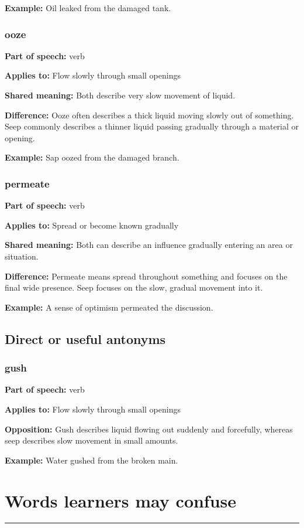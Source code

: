 \documentclass[11pt]{article}
\newcommand{\sectionrule}{\par\vspace{-0.5em}\noindent\textcolor{Accent}{\rule{\linewidth}{0.6pt}}\par}
\begin{document}
\textbf{Example:} Oil leaked from the damaged tank.

\subsubsection{ooze}
\textbf{Part of speech:} verb

\textbf{Applies to:} Flow slowly through small openings

\textbf{Shared meaning:} Both describe very slow movement of liquid.

\textbf{Difference:} Ooze often describes a thick liquid moving slowly out of something. Seep commonly describes a thinner liquid passing gradually through a material or opening.

\textbf{Example:} Sap oozed from the damaged branch.

\subsubsection{permeate}
\textbf{Part of speech:} verb

\textbf{Applies to:} Spread or become known gradually

\textbf{Shared meaning:} Both can describe an influence gradually entering an area or situation.

\textbf{Difference:} Permeate means spread throughout something and focuses on the final wide presence. Seep focuses on the slow, gradual movement into it.

\textbf{Example:} A sense of optimism permeated the discussion.

\subsection{Direct or useful antonyms}
\subsubsection{gush}
\textbf{Part of speech:} verb

\textbf{Applies to:} Flow slowly through small openings

\textbf{Opposition:} Gush describes liquid flowing out suddenly and forcefully, whereas seep describes slow movement in small amounts.

\textbf{Example:} Water gushed from the broken main.

\section{Words learners may confuse}
\sectionrule
\end{document}
